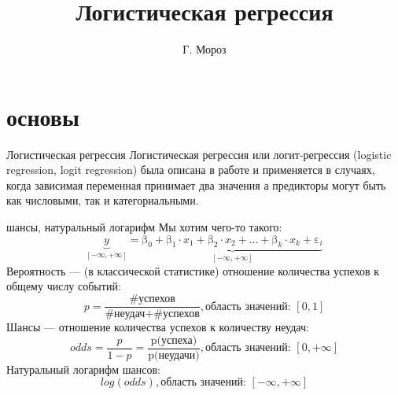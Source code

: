 
\usepackage{subfig}
\newcommand{\mcrot}[4]{\multicolumn{#1}{#2}{\rlap{\rotatebox{#3}{#4}~}}} 
\title[]{Логистическая регрессия}
\author[]{Г. Мороз}
\date{}

\frame{\titlepage}
\section{основы}
\begin{frame}{Логистическая регрессия}
Логистическая регрессия или логит-регрессия (logistic regression, logit regression) была описана в работе \citep{cox58} и применяется в случаях, когда зависимая переменная принимает два значения а предикторы могут быть как числовыми, так и категориальными.
\end{frame}
\begin{frame}{шансы, натуральный логарифм}
\vspace{-2mm}
Мы хотим чего-то такого:
$$\underbrace{y}_{[-\infty, +\infty]}=\underbrace{\mbox{β}_0+\mbox{β}_1\cdot x_1+\mbox{β}_2\cdot x_2 + \dots +\mbox{β}_k\cdot x_k +\mbox{ε}_i}_{[-\infty, +\infty]}$$
Вероятность — (в классической статистике) отношение количества успехов к общему числу событий:
$$p = \frac{\mbox{\# успехов}}{\mbox{\# неудач} + \mbox{\# успехов}}, \mbox{область значений: }[0, 1]$$
Шансы — отношение количества успехов к количеству неудач:
$$odds = \frac{p}{1-p} = \frac{\mbox{p(успеха)}}{\mbox{p(неудачи)}}, \mbox{область значений: }[0, +\infty]$$
Натуральный логарифм шансов:
$$log(odds), \mbox{область значений: }[-\infty, +\infty]$$
\end{frame}
